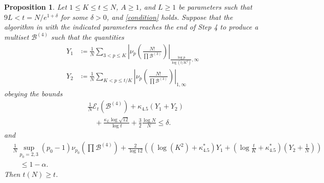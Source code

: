 \documentclass[12pt,a4paper,reqno]{amsart}
\numberwithin{equation}{section}
\theoremstyle{plain}
\newtheorem{proposition}[theorem]{Proposition}
\theoremstyle{definition}
\newcommand\tuple{{\mathcal B}}
\newcommand\excess{{\mathcal{E}}}
\begin{document}
\begin{proposition}\label{balance-23'}  Let $1 \leq K \leq t \leq N$, $A \geq 1$, and $L \geq 1$ be parameters such that $9L < t = N/e^{1+\delta}$ for some $\delta>0$, and \eqref{condition} holds.  Suppose that the algorithm in  with the indicated parameters reaches the end of Step 4 to produce a multiset $\tuple^{(4)}$ such that the quantities
  \begin{align}
    Y_1 &\coloneqq \frac{1}{N} \sum_{3 < p \leq K} \left|\nu_p\left(\frac{N!}{\prod \tuple^{(3)}}\right)\right|_{\frac{\log p}{\log (t/K^2)},\infty}  \label{y1-def}\\
    Y_2 &\coloneqq \frac{1}{N} \sum_{K < p \leq t/K} \left|\nu_p\left(\frac{N!}{\prod \tuple^{(3)}}\right)\right|_{1,\infty}\label{y2-def}
  \end{align}
  obeying the bounds
\begin{equation}\label{new-balance-4}
  \begin{split}
&    \frac{1}{N}  \excess_t(\tuple^{(4)}) + \kappa_{4.5} (Y_1 + Y_2) 
 \\
&\quad  + \frac{\kappa_L \log \sqrt{12}}{\log t}  + \frac{3}{2} \frac{\log N}{N}   \leq \delta. 
  \end{split}
 \end{equation}
and
 \begin{align*}
  &\frac{1}{N} \sup_{p_0=2,3} (p_0-1) \nu_{p_0}\left(\prod \tuple^{(4)}\right) + \frac{2}{\log 12}\left( (\log(K^2)+\kappa^*_{4.5}) Y_1 + (\log\frac{t}{K}+\kappa^*_{4.5}) (Y_2+\frac{1}{N}) \right) \\
&\quad
  \leq 1 - \alpha.
 \end{align*}
Then $t(N) \geq t$.
\end{proposition}
\end{document}
